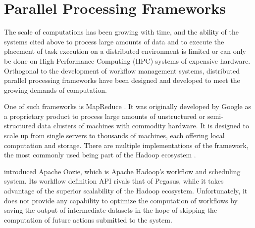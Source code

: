 \section{Parallel Processing Frameworks}

The scale of computations has been growing with time, and the ability of the systems cited above to process large amounts of data and to execute the placement of task execution on a distributed environment is limited or can only be done on High Performance Computing (HPC) systems of expensive hardware.  Orthogonal to the development of workflow management systems, distributed parallel processing frameworks have been designed and developed to meet the growing demands of computation.  

One of such frameworks is MapReduce \citep{dean2008mapreduce}. It was originally developed by Google as a proprietary product to process large amounts of unstructured or semi-structured data clusters of machines with commodity hardware. It is designed to scale up from single servers to thousands of machines, each offering local computation and storage. There are multiple implementations of the framework, the most commonly used being part of the Hadoop ecosystem \citep{white2012hadoop}.

\cite{islam2012oozie} introduced Apache Oozie, which is Apache Hadoop's workflow and scheduling system.  Its workflow definition API rivals that of Pegasus, while it takes advantage of the superior scalability of the Hadoop ecosystem. Unfortunately, it does not provide any capability to optimize the computation of workflows by saving the output of intermediate datasets in the hope of skipping the computation of future actions submitted to the system.
